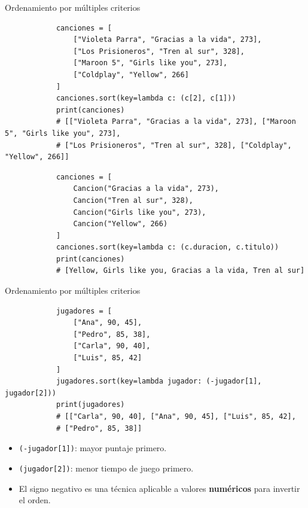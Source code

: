 \documentclass{beamer}
\begin{document}
    \begin{frame}[fragile, t]{Ordenamiento por múltiples criterios}
        \begin{verbatim}
            canciones = [
                ["Violeta Parra", "Gracias a la vida", 273],
                ["Los Prisioneros", "Tren al sur", 328],
                ["Maroon 5", "Girls like you", 273],
                ["Coldplay", "Yellow", 266]
            ]
            canciones.sort(key=lambda c: (c[2], c[1]))
            print(canciones)
            # [["Violeta Parra", "Gracias a la vida", 273], ["Maroon 5", "Girls like you", 273], 
            # ["Los Prisioneros", "Tren al sur", 328], ["Coldplay", "Yellow", 266]]
        \end{verbatim}

        \begin{verbatim}
            canciones = [
                Cancion("Gracias a la vida", 273),
                Cancion("Tren al sur", 328),
                Cancion("Girls like you", 273),
                Cancion("Yellow", 266)
            ]
            canciones.sort(key=lambda c: (c.duracion, c.titulo))
            print(canciones)
            # [Yellow, Girls like you, Gracias a la vida, Tren al sur]
        \end{verbatim}
    \end{frame}

    \begin{frame}[fragile, t]{Ordenamiento por múltiples criterios}
        \begin{verbatim}
            jugadores = [
                ["Ana", 90, 45],
                ["Pedro", 85, 38],
                ["Carla", 90, 40],
                ["Luis", 85, 42]
            ]
            jugadores.sort(key=lambda jugador: (-jugador[1], jugador[2]))
            print(jugadores)
            # [["Carla", 90, 40], ["Ana", 90, 45], ["Luis", 85, 42], 
            # ["Pedro", 85, 38]]
        \end{verbatim}
        \begin{itemize}
            \item \texttt{(-jugador[1])}: mayor puntaje primero.
            \item \texttt{(jugador[2])}: menor tiempo de juego primero.
            \item El signo negativo es una técnica aplicable a valores \textbf{numéricos} para invertir el orden.
        \end{itemize}
    \end{frame}
\end{document}

